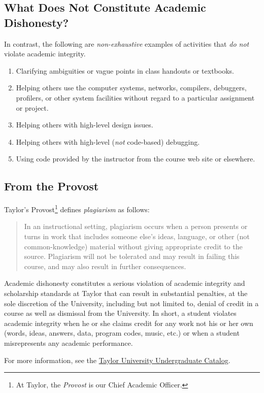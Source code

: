 \subsection{What Does Not Constitute Academic Dishonesty?}

In contrast, the following are \emph{non-exhaustive} examples of activities
that \emph{do not} violate academic integrity.

\begin{enumerate}
\item Clarifying ambiguities or vague points in class handouts or textbooks.
\item Helping others use the computer systems, networks, compilers, debuggers,
  profilers, or other system facilities without regard to a particular assignment or project.
\item Helping others with high-level design issues.
\item Helping others with high-level (\emph{not} code-based) debugging.
\item Using code provided by the instructor from the course web site or elsewhere.
\end{enumerate}

\subsection{From the Provost}

Taylor's Provost\footnote{At Taylor, the \emph{Provost} is our Chief Academic Officer.}
defines \emph{plagiarism} as follows:
\begin{quote}
  In an instructional setting,
  plagiarism occurs when a person presents or turns in work
  that includes someone else's ideas, language, or other (not common-knowledge) material
  without giving appropriate credit to the source.
  Plagiarism will not be tolerated
  and may result in failing this course,
  and may also result in further consequences.
\end{quote}
Academic dishonesty constitutes a serious violation
of academic integrity and scholarship standards at Taylor
that can result in substantial penalties,
at the sole discretion of the University,
including but not limited to,
denial of credit in a course as well as dismissal from the University.
In short, a student violates academic integrity
when he or she claims credit for any work not his or her own
(words, ideas, answers, data, program codes, music, etc.)
or when a student misrepresents any academic performance.

For more information, see the
\href{http://www.taylor.edu/academics/files/undergrad-catalog/current/catalog.pdf}%
{Taylor University Undergraduate Catalog}.


